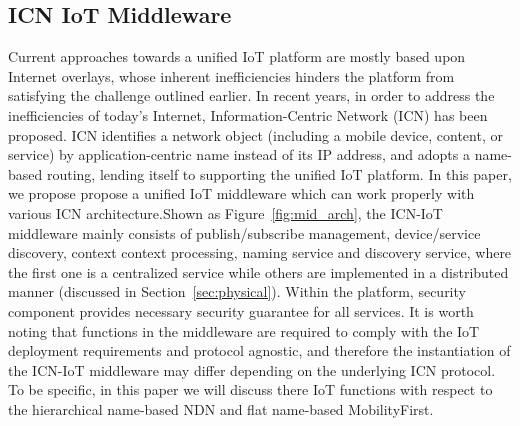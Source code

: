 \subsection{ICN IoT Middleware}
Current approaches towards a unified IoT platform are mostly based upon Internet overlays, whose inherent inefficiencies hinders the platform from satisfying the challenge outlined earlier. In recent years, in order to address  the inefficiencies of today's Internet, Information-Centric Network (ICN) has been proposed. ICN identifies a network object (including a mobile device, content, or service) by application-centric name instead of its IP address, and adopts a name-based routing, lending itself to supporting the unified IoT platform. In this paper, we propose propose a unified IoT middleware which can work properly with various ICN architecture.Shown as Figure~\ref{fig:mid_arch}, the ICN-IoT middleware mainly consists of publish/subscribe management, device/service discovery, context context processing, naming service and discovery service, where the first one is a centralized service while others are implemented in a distributed manner (discussed in Section~\ref{sec:physical}). Within the platform, security component provides necessary security guarantee for all services. It is worth noting that functions in the middleware are required to comply with the IoT deployment requirements and protocol agnostic, and therefore the instantiation of the ICN-IoT middleware may differ depending on the underlying ICN protocol. To be specific, in this paper we will discuss there IoT functions with respect to the hierarchical name-based NDN and flat name-based MobilityFirst. 
